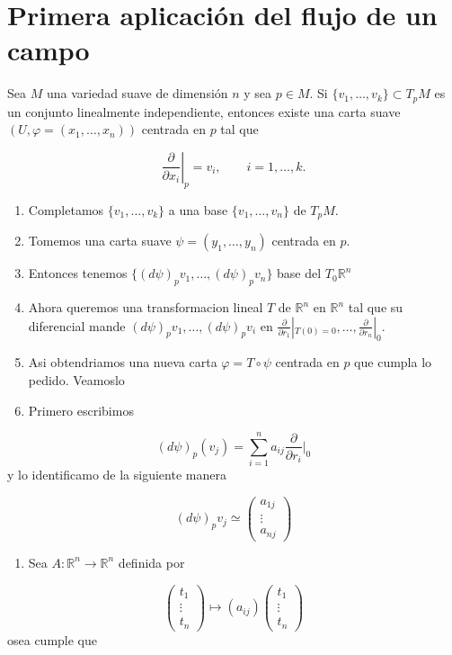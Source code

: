 \section{Primera aplicación del flujo de un campo}
\begin{booklemma}{}
Sea $M$ una variedad suave de dimensión $n$ y sea $p\in M$. Si $\{v_1,\ldots,v_k\}\subset T_pM$ es un conjunto linealmente independiente, entonces existe una carta suave $(U,\varphi=(x_1,\ldots,x_n))$ centrada en $p$ tal que

\[
\left.\frac{\partial}{\partial x_i}\right|_p=v_i,\qquad i=1,\ldots,k.
\]
\end{booklemma}
\begin{bookproof}{}
\begin{enumerate}
\item Completamos $\{v_1,\ldots,v_k\}$ a una base $\{v_1,\ldots,v_n\}$ de $T_pM$.
\item Tomemos una carta suave $\psi=(y_1,\ldots,y_n)$ centrada en $p$.
\item Entonces tenemos  $\{(d\psi)_pv_1,\ldots,(d\psi)_pv_n\}$ base del $T_{0}\mathbb{R}^{n}$
\item Ahora queremos una transformacion lineal $T$ de $\mathbb{R}^{n}$ en $\mathbb{R}^{n}$ tal que su diferencial mande $(d\psi)_{p}v_{1},\ldots,(d\psi)_{p}v_{i}$ en $\frac{\partial}{\partial r_{1}}|_{T(0)=0},\ldots,\frac{\partial}{\partial r_{n}}|_{0}$.
\item Asi obtendriamos una nueva carta $\varphi=T\circ\psi$ centrada en $p$ que cumpla lo pedido. Veamoslo
\item Primero escribimos
\end{enumerate}
\[
(d\psi)_{p}(v_{j})=\sum^{n}_{i=1} a_{ij}\frac{\partial}{\partial r_{i}}\bigg|_{0}
\]
y lo identificamo de la siguiente manera

\[
(d\psi)_{p}v_{j}\simeq\begin{pmatrix} a_{1j} \\  \vdots \\ a_{nj} \end{pmatrix}
\]
\begin{enumerate}[start=7]
\item Sea $A:\mathbb R^n\to\mathbb R^n$ definida por
\end{enumerate}
\[
\begin{pmatrix} t_{1} \\  \vdots \\ t_{n} \end{pmatrix}\mapsto(a_{ij})\begin{pmatrix} t_{1} \\  \vdots \\ t_{n} \end{pmatrix}
\]
osea cumple que


\end{bookproof}
